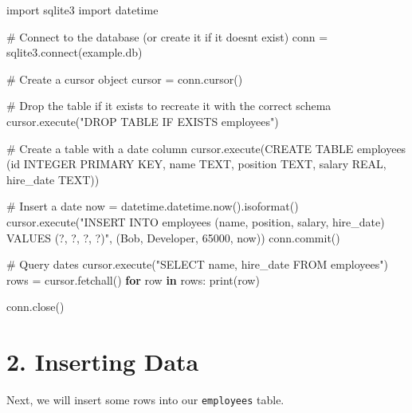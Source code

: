 \documentclass[
  letterpaper,
  DIV=11,
  numbers=noendperiod]{scrreprt}
\newenvironment{Shaded}{\begin{snugshade}}{\end{snugshade}}
\newcommand{\BuiltInTok}[1]{\textcolor[rgb]{0.00,0.23,0.31}{#1}}
\newcommand{\CommentTok}[1]{\textcolor[rgb]{0.37,0.37,0.37}{#1}}
\newcommand{\ControlFlowTok}[1]{\textcolor[rgb]{0.00,0.23,0.31}{\textbf{#1}}}
\newcommand{\DecValTok}[1]{\textcolor[rgb]{0.68,0.00,0.00}{#1}}
\newcommand{\ExtensionTok}[1]{\textcolor[rgb]{0.00,0.23,0.31}{#1}}
\newcommand{\ImportTok}[1]{\textcolor[rgb]{0.00,0.46,0.62}{#1}}
\newcommand{\KeywordTok}[1]{\textcolor[rgb]{0.00,0.23,0.31}{\textbf{#1}}}
\newcommand{\NormalTok}[1]{\textcolor[rgb]{0.00,0.23,0.31}{#1}}
\newcommand{\OperatorTok}[1]{\textcolor[rgb]{0.37,0.37,0.37}{#1}}
\newcommand{\StringTok}[1]{\textcolor[rgb]{0.13,0.47,0.30}{#1}}
\begin{document}
\begin{Shaded}
\begin{Highlighting}[]
\ImportTok{import}\NormalTok{ sqlite3}
\ImportTok{import}\NormalTok{ datetime}

\CommentTok{\# Connect to the database (or create it if it doesn\textquotesingle{}t exist)}
\NormalTok{conn }\OperatorTok{=}\NormalTok{ sqlite3.}\ExtensionTok{connect}\NormalTok{(}\StringTok{\textquotesingle{}example.db\textquotesingle{}}\NormalTok{)}

\CommentTok{\# Create a cursor object}
\NormalTok{cursor }\OperatorTok{=}\NormalTok{ conn.cursor()}

\CommentTok{\# Drop the table if it exists to recreate it with the correct schema}
\NormalTok{cursor.execute(}\StringTok{"DROP TABLE IF EXISTS employees"}\NormalTok{)}

\CommentTok{\# Create a table with a date column}
\NormalTok{cursor.execute(}\StringTok{\textquotesingle{}\textquotesingle{}\textquotesingle{}CREATE TABLE employees}
\StringTok{                  (id INTEGER PRIMARY KEY, name TEXT, position TEXT, salary REAL, hire\_date TEXT)\textquotesingle{}\textquotesingle{}\textquotesingle{}}\NormalTok{)}

\CommentTok{\# Insert a date}
\NormalTok{now }\OperatorTok{=}\NormalTok{ datetime.datetime.now().isoformat()}
\NormalTok{cursor.execute(}\StringTok{"INSERT INTO employees (name, position, salary, hire\_date) VALUES (?, ?, ?, ?)"}\NormalTok{,}
\NormalTok{               (}\StringTok{\textquotesingle{}Bob\textquotesingle{}}\NormalTok{, }\StringTok{\textquotesingle{}Developer\textquotesingle{}}\NormalTok{, }\DecValTok{65000}\NormalTok{, now))}
\NormalTok{conn.commit()}

\CommentTok{\# Query dates}
\NormalTok{cursor.execute(}\StringTok{"SELECT name, hire\_date FROM employees"}\NormalTok{)}
\NormalTok{rows }\OperatorTok{=}\NormalTok{ cursor.fetchall()}
\ControlFlowTok{for}\NormalTok{ row }\KeywordTok{in}\NormalTok{ rows:}
    \BuiltInTok{print}\NormalTok{(row)}

\NormalTok{conn.close()}
\end{Highlighting}
\end{Shaded}

\section{2. Inserting Data}\label{inserting-data}

Next, we will insert some rows into our \texttt{employees} table.
\end{document}
